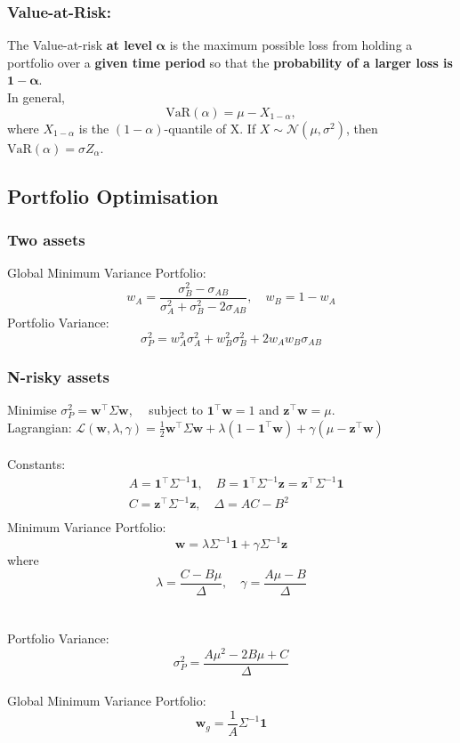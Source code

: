 \documentclass[11pt]{article}
\begin{document}
	\subsubsection{Value-at-Risk:}
	The Value-at-risk \textbf{at level }\( \bm{\alpha} \) is the maximum possible loss from holding a portfolio over a \textbf{given time period} so that the \textbf{probability of a larger loss is} \(\bm{1 - \alpha}  \).\\
	In general, 
	\[	\text{VaR}(\alpha) = \mu - X_{1 - \alpha},
		\]
	where \( X_{1-\alpha} \) is the \( (1 - \alpha) \)-quantile of X.
	If \( X\sim\mathcal{N}(\mu, \sigma^2) \), then 
	\(	\text{VaR}(\alpha) = \sigma Z_{\alpha}
		\).
	\subsection{Portfolio Optimisation}
	\subsubsection{Two assets}
	Global Minimum Variance Portfolio: \[	w_A = \frac{\sigma^2_B - \sigma_{AB}}{\sigma^2_A + \sigma^2_B - 2\sigma_{AB}},\quad w_B = 1 - w_A\]
	Portfolio Variance:
	\[	\sigma_P^2 = w_A^2 \sigma_A^2 + w_B^2 \sigma_B^2 + 2w_A w_B\sigma_{AB}\]
	
	\subsubsection{N-risky assets}
	Minimise \( \displaystyle\sigma_P^2 = \bm{w}^{\top} \Sigma \bm{w} \), \( \quad \)subject to \( \bm{1}^{\top}\bm{w}= 1 \) and \( \bm{z}^{\top}\bm{w}=\mu \).\\[5pt]
	Lagrangian: \( \mathcal{L}(\bm{w}, \lambda, \gamma)  = \frac{1}{2} \bm{w}^{\top} \Sigma \bm{w} + \lambda (1 - \bm{1}^{\top}\bm{w}) + \gamma (\mu - \bm{z}^{\top}\bm{w})\)\\\\
	Constants: \begin{align*}
				&	A = \bm{1}^{\top}\Sigma^{-1}\bm{1},\quad B =  \bm{1}^{\top}\Sigma^{-1}\bm{z} = \bm{z}^{\top}\Sigma^{-1}\bm{1}\\[2pt]
				&	C = \bm{z}^{\top}\Sigma^{-1}\bm{z}, \quad\Delta = AC - B^2\\
				\end{align*} 
	Minimum Variance Portfolio: 
	\[ \displaystyle\bm{w} = \lambda \Sigma^{-1} \bm{1} + \gamma \Sigma^{-1}\bm{z}  \]where \[ \lambda = \frac{C - B\mu}{\Delta}, \quad\gamma = \frac{A \mu- B}{\Delta} \]\\\\
	Portfolio Variance: \[ \sigma_P^2 = \frac{A\mu^2 -2B\mu + C}{\Delta} \]\\
	Global Minimum Variance Portfolio: \[ \bm{w}_g = \frac{1}{A}\Sigma^{-1}\bm{1} \]
	
\end{document}
